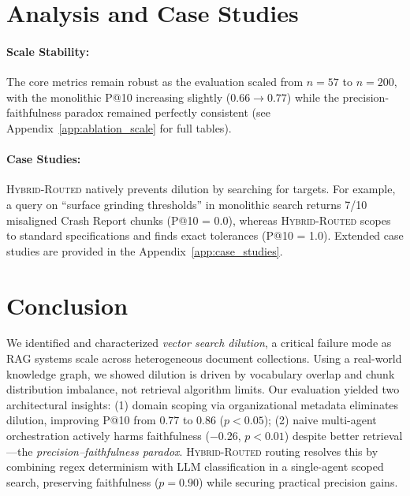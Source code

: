 \documentclass{article}
\newcommand{\hybridname}{\textsc{Hybrid-Routed}}
\begin{document}
\section{Analysis and Case Studies}
\label{sec:analysis_and_case_studies}

\paragraph{Scale Stability:} The core metrics remain robust as the evaluation scaled from $n=57$ to $n=200$, with the monolithic P@10 increasing slightly ($0.66 \rightarrow 0.77$) while the precision-faithfulness paradox remained perfectly consistent (see Appendix~\ref{app:ablation_scale} for full tables).

\paragraph{Case Studies:} \hybridname{} natively prevents dilution by searching for targets. For example, a query on ``surface grinding thresholds'' in monolithic search returns 7/10 misaligned Crash Report chunks (P@10 = 0.0), whereas \hybridname{} scopes to standard specifications and finds exact tolerances (P@10 = 1.0). Extended case studies are provided in the Appendix~\ref{app:case_studies}.

\section{Conclusion}
We identified and characterized \textit{vector search dilution}, a critical failure mode as RAG systems scale across heterogeneous document collections. Using a real-world knowledge graph, we showed dilution is driven by vocabulary overlap and chunk distribution imbalance, not retrieval algorithm limits. Our evaluation yielded two architectural insights: (1) domain scoping via organizational metadata eliminates dilution, improving P@10 from 0.77 to 0.86 ($p < 0.05$); (2) naive multi-agent orchestration actively harms faithfulness ($-$0.26, $p < 0.01$) despite better retrieval---the \textit{precision--faithfulness paradox}. \hybridname{} routing resolves this by combining regex determinism with LLM classification in a single-agent scoped search, preserving faithfulness ($p = 0.90$) while securing practical precision gains.
\end{document}
